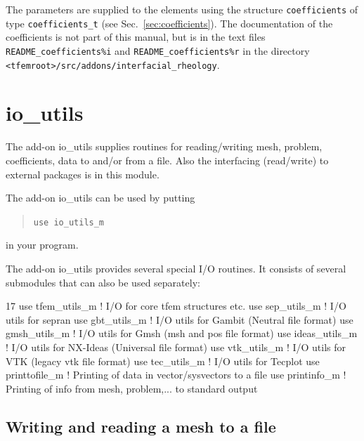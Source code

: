 The parameters are supplied to the elements using the structure
\texttt{coefficients} of type \texttt{coefficients\_t} (see
Sec.~\ref{sec:coefficients}). The documentation of the coefficients is not
part of this manual, but is in the text files \texttt{README\_coefficients\%i}
and \texttt{README\_coefficients\%r} in the directory
\texttt{<tfemroot>/src/addons/interfacial\_rheology}.

\section{io\_utils}
\label{sec:io}

The add-on io\_utils supplies
routines for reading/writing mesh, problem, coefficients, data to
          and/or from a file. Also the interfacing (read/write) to external
          packages is in this module.

The add-on io\_utils can be used by putting
\begin{quote}
   \texttt{use io\_utils\_m}
\end{quote}
in your program.

The add-on io\_utils provides several special I/O routines. It consists of
several submodules that can also be used separately:
\begin{listing}{17}
  use tfem_utils_m  ! I/O for core tfem structures etc.
  use sep_utils_m   ! I/O utils for sepran
  use gbt_utils_m   ! I/O utils for Gambit (Neutral file format)
  use gmsh_utils_m  ! I/O utils for Gmsh (msh and pos file format)
  use ideas_utils_m ! I/O utils for NX-Ideas (Universal file format)
  use vtk_utils_m   ! I/O utils for VTK (legacy vtk file format)
  use tec_utils_m   ! I/O utils for Tecplot
  use printtofile_m ! Printing of data in vector/sysvectors to a file
  use printinfo_m   ! Printing of info from mesh, problem,... to standard output
\end{listing}

\subsection{Writing and reading a mesh to a file}
\label{sec:iomesh}

